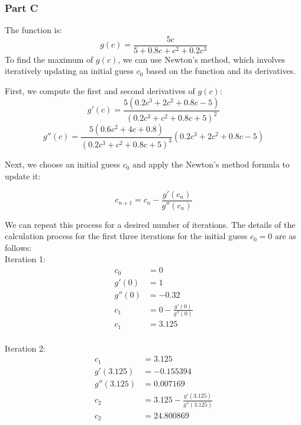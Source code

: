 \documentclass[12pt, a4paper]{article}
\numberwithin{equation}{section}
\begin{document}
\subsubsection{Part C}
The function is:\\
\begin{equation}
g(c) = \frac{5c}{5+0.8c+c^2+0.2c^3}
\end{equation}
To find the maximum of $g(c)$, we can use Newton's method, which involves iteratively updating an initial guess $c_0$ based on the function and its derivatives.

First, we compute the first and second derivatives of $g(c)$:
\begin{equation}
g'(c) = \frac{5(0.2c^3+2c^2+0.8c-5)}{(0.2c^3+c^2+0.8c+5)^2} 
\end{equation}
\begin{equation}
    g''(c) = \frac{5(0.6c^2+4c+0.8)}{(0.2c^3+c^2+0.8c+5)^3} \left(0.2c^3+2c^2+0.8c-5\right)
\end{equation}

Next, we choose an initial guess $c_0$ and apply the Newton's method formula to update it:

\begin{equation}
    c_{n+1} = c_n - \frac{g'(c_n)}{g''(c_n)}
\end{equation}


We can repeat this process for a desired number of iterations.
The details of the calculation process for the first three iterations for the initial guess $c_0 = 0$ are as follows:\\
\newpage
Iteration 1:
\begin{equation}
\begin{align*}
c_{0} &= 0 \\
g'(0) &= 1 \\
g''(0) &= -0.32 \\
c_{1} &= 0 - \frac{g'(0)}{g''(0)}\\
c_{1} &= 3.125\\
\end{align*}    
\end{equation}

Iteration 2:
\begin{equation}
\begin{align*}
c_{1} &= 3.125\\
g'(3.125) &= -0.155394 \\
g''(3.125) &= 0.007169 \\
c_{2} &= 3.125 - \frac{g'(3.125)}{g''(3.125)}\\
c_{2} &= 24.800869\\
\end{align*}    
\end{equation}
\end{document}
